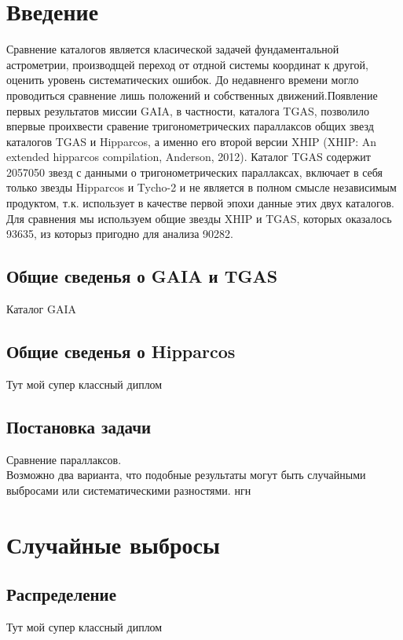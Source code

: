 \documentclass[14pt,a4paper,russian]{article}
\begin{document}
 
\section{Введение}\label{introduction}

Сравнение каталогов является класической задачей фундаментальной астрометрии, производщей переход от отдной системы координат к другой, оценить уровень систематических ошибок. До недавненго времени могло проводиться сравнение лишь положений и собственных движений.Появление первых результатов миссии GAIA, в частности, каталога TGAS, позволило впервые проихвести сравение тригонометрических параллаксов общих звезд каталогов TGAS и  Hipparcos, а именно его второй версии XHIP (XHIP: An extended hipparcos compilation, Anderson, 2012). Каталог TGAS содержит 2057050 звезд с данными о тригонометрических параллаксах, включает в себя только звезды Hipparcos и Tycho-2  и не является в полном смысле независимым продуктом, т.к. использует в качестве первой эпохи данные этих двух каталогов. Для сравнения мы используем общие звезды XHIP  и TGAS, которых оказалось 93635, из которыз пригодно для анализа 90282.

\subsection{Общие сведенья о GAIA и TGAS}\label{sub:smthgaia}
Каталог GAIA
		
\subsection{Общие сведенья о Hipparcos}\label{sub:smthhip}
Тут мой супер классный диплом

\subsection{Постановка задачи}\label{sub:smthzd}
	Сравнение параллаксов.\\
Возможно два варианта, что подобные результаты могут быть случайными выбросами или систематическими разностями. нгн
			 
\section{Случайные выбросы}\label{errvid}

\subsection{Распределение}\label{sub:smthrs}
Тут мой супер классный диплом
\end{document}
